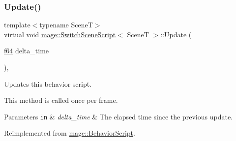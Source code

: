 \subsubsection{\texorpdfstring{Update()}{Update()}}
{\footnotesize\ttfamily template$<$typename SceneT$>$ \\
virtual void \hyperlink{classmage_1_1_switch_scene_script}{mage\+::\+Switch\+Scene\+Script}$<$ SceneT $>$\+::Update (\begin{DoxyParamCaption}\item[{\hyperlink{namespacemage_ab935747c6941320bd6214b5a5f265b09}{f64}}]{delta\+\_\+time }\end{DoxyParamCaption})\hspace{0.3cm}{\ttfamily [override]}, {\ttfamily [virtual]}}

Updates this behavior script.

This method is called once per frame.


\begin{DoxyParams}[1]{Parameters}
\mbox{\tt in}  & {\em delta\+\_\+time} & The elapsed time since the previous update. \\
\hline
\end{DoxyParams}


Reimplemented from \hyperlink{classmage_1_1_behavior_script_ae42e869ca8d4e4b3ad2af589b0ca9924}{mage\+::\+Behavior\+Script}.

